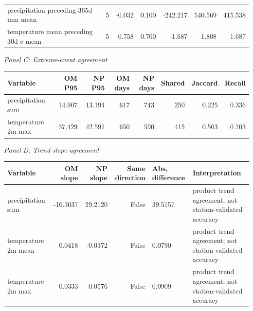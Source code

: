 \begin{landscape}
\begin{center}
\begin{adjustbox}{max width=\linewidth}
\begin{tabular}{p{0.34\textwidth}rrrrrr}
precipitation preceding 365d mm mean & 5 & -0.032 & 0.100 & -242.217 & 540.569 & 415.538 \\
temperature mean preceding 30d c mean & 5 & 0.758 & 0.700 & -1.687 & 1.808 & 1.687 \\
\bottomrule
\end{tabular}
\end{adjustbox}
\end{center}
\endgroup
\par\medskip\noindent\textit{Panel C: Extreme-event agreement}\par
\begingroup
\scriptsize
\setlength{\tabcolsep}{3pt}
\begin{center}
\begin{adjustbox}{max width=\linewidth}
\begin{tabular}{p{0.22\textwidth}rrrrrrr}
\toprule
Variable & OM P95 & NP P95 & OM days & NP days & Shared & Jaccard & Recall \\
\midrule
precipitation sum & 14.907 & 13.194 & 617 & 743 & 250 & 0.225 & 0.336 \\
temperature 2m max & 37.429 & 42.591 & 650 & 590 & 415 & 0.503 & 0.703 \\
\bottomrule
\end{tabular}
\end{adjustbox}
\end{center}
\endgroup
\par\medskip\noindent\textit{Panel D: Trend-slope agreement}\par
\begingroup
\scriptsize
\setlength{\tabcolsep}{3pt}
\begin{center}
\begin{adjustbox}{max width=\linewidth}
\begin{tabular}{p{}rrrp{}p{}}
\toprule
Variable & OM slope & NP slope & Same direction & Abs. difference & Interpretation \\
\midrule
precipitation sum & -10.3037 & 29.2120 & False & 39.5157 & product trend agreement; not station-validated accuracy \\
temperature 2m mean & 0.0418 & -0.0372 & False & 0.0790 & product trend agreement; not station-validated accuracy \\
temperature 2m max & 0.0333 & -0.0576 & False & 0.0909 & product trend agreement; not station-validated accuracy \\
\bottomrule
\end{tabular}
\end{adjustbox}
\end{center}
\endgroup
\end{landscape}
